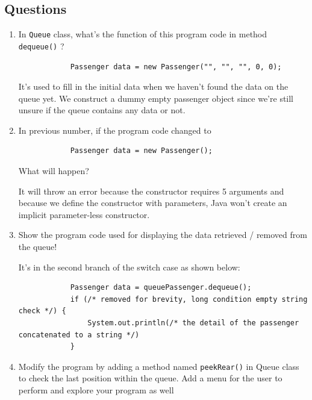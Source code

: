 \documentclass[12pt,titlepage]{article}
\begin{document}
\subsection*{Questions}
\begin{enumerate}
    \item {
        In \texttt{Queue} class, what's the function of this program code in method \texttt{dequeue()} ?

        \begin{verbatim}
            Passenger data = new Passenger("", "", "", 0, 0);
        \end{verbatim}

        It's used to fill in the initial data when we haven't found the data on the queue yet. We construct
        a dummy empty passenger object since we're still unsure if the queue contains any data or not.
    }
    \item {
        In previous number, if the program code changed to

        \begin{verbatim}
            Passenger data = new Passenger();
        \end{verbatim}

        What will happen?

        It will throw an error because the constructor requires 5 arguments and because we define the constructor with parameters,
        Java won't create an implicit parameter-less constructor.
    }
    \item {
        Show the program code used for displaying the data retrieved / removed from the queue!

        \pagebreak

        It's in the second branch of the switch case as shown below:

        \begin{verbatim}
            Passenger data = queuePassenger.dequeue();
            if (/* removed for brevity, long condition empty string check */) {
                System.out.println(/* the detail of the passenger concatenated to a string */)
            }
        \end{verbatim}
    }
    \item {
        Modify the program by adding a method named \texttt{peekRear()} in Queue class to check the
        last position within the queue. Add a menu for the user to perform and explore your program as well

}
\end{enumerate}
\end{document}
